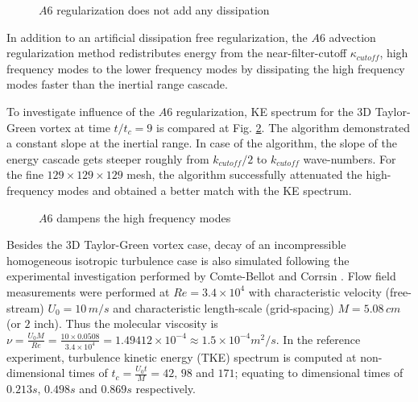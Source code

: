 \begin{figure}[!h]
\centering
{}
\caption{$A6$ regularization does not add any dissipation} 
\label{fig:TGV3D-5k-A6}
\end{figure}

In addition to an artificial dissipation free regularization, the $A6$ advection regularization method redistributes energy from the near-filter-cutoff $\kappa_{cutoff}$, high frequency modes to the lower frequency modes by dissipating the high frequency modes faster than the inertial range cascade. 

To investigate influence of the $A6$ regularization, KE spectrum for the 3D Taylor-Green vortex at time $t/t_c =9$ is compared at Fig. \ref{fig:TGV3D-5k-A6Spec}. The \spaece algorithm demonstrated a constant slope at the inertial range. In case of the \spaeceA algorithm, the slope of the energy cascade gets steeper roughly from $k_{cutoff}/2$ to $k_{cutoff}$ wave-numbers. For the fine $129 \times 129 \times 129$ mesh, the \spaeceA algorithm successfully attenuated the high-frequency modes and obtained a better match with the KE spectrum.

\begin{figure}[!h]
\centering
{}
\caption{$A6$ dampens the high frequency modes} 
\label{fig:TGV3D-5k-A6Spec}
\end{figure}

Besides the 3D Taylor-Green vortex case, decay of an incompressible homogeneous isotropic turbulence case is also simulated following the experimental investigation performed by Comte-Bellot and Corrsin \cite{CBC1971}. Flow field measurements were performed at $Re = 3.4\times10^4$ with characteristic velocity (free-stream) $U_0 = 10\, m/s$ and characteristic length-scale (grid-spacing) $M = 5.08\, cm$ (or $2$ inch). Thus the molecular viscosity is $ \nu = \frac{U_0 M}{Re} = \frac{10 \times 0.0508}{3.4\times10^4} = 1.49412 \times10^{-4} \approx 1.5\times10^{-4} m^2/s$. In the reference experiment, turbulence kinetic energy (TKE) spectrum is computed at non-dimensional times of $t_c = \frac{U_0 t}{M} = 42,\, 98$ and $171$; equating to dimensional times of $0.213s,\, 0.498s$ and $0.869s$ respectively.


